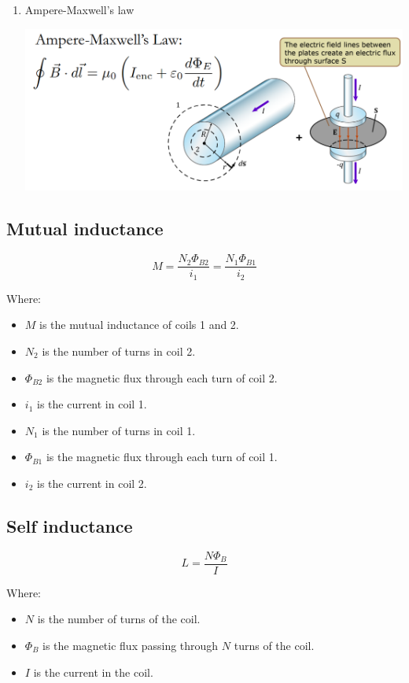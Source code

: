\documentclass[11pt]{article}
\begin{document}
\begin{enumerate}
\item Ampere-Maxwell's law
\label{sec:org2f9fbe3}
\begin{center}
\includegraphics[width=.9\linewidth]{./images/ampere-maxwell-law.png}
\end{center}
\end{enumerate}

\subsection{Mutual inductance}
\label{sec:org48c4267}
\[M = \frac{N_2 \Phi_{B2}}{i_1} = \frac{N_1 \Phi_{B1}}{i_2}\]

Where:
\begin{itemize}
\item \(M\) is the mutual inductance of coils 1 and 2.
\item \(N_2\) is the number of turns in coil 2.
\item \(\Phi_{B2}\) is the magnetic flux through each turn of coil 2.
\item \(i_1\) is the current in coil 1.
\item \(N_1\) is the number of turns in coil 1.
\item \(\Phi_{B1}\) is the magnetic flux through each turn of coil 1.
\item \(i_2\) is the current in coil 2.
\end{itemize}

\subsection{Self inductance}
\label{sec:org4908069}
\[L = \frac{N \Phi_B}{I}\]

Where:
\begin{itemize}
\item \(N\) is the number of turns of the coil.
\item \(\Phi_B\) is the magnetic flux passing through \(N\) turns of the coil.
\item \(I\) is the current in the coil.
\end{itemize}
\end{document}
